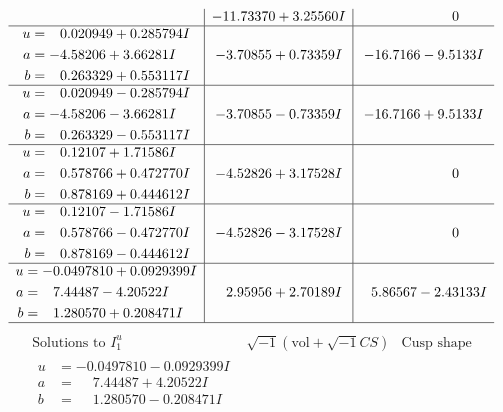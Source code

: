 \documentclass[1p]{elsarticle_modified}
\theoremstyle{definition}
\newcommand{\I}{\sqrt{-1}}
\begin{document}
$$\begin{array}{c|c|c}
 & -11.73370 + 3.25560 I & \phantom{-0.000000 } 0 \\ \hline\begin{aligned}
u &= \phantom{-}0.020949 + 0.285794 I \\
a &= -4.58206 + 3.66281 I \\
b &= \phantom{-}0.263329 + 0.553117 I\end{aligned}
 & -3.70855 + 0.73359 I & -16.7166 - 9.5133 I \\ \hline\begin{aligned}
u &= \phantom{-}0.020949 - 0.285794 I \\
a &= -4.58206 - 3.66281 I \\
b &= \phantom{-}0.263329 - 0.553117 I\end{aligned}
 & -3.70855 - 0.73359 I & -16.7166 + 9.5133 I \\ \hline\begin{aligned}
u &= \phantom{-}0.12107 + 1.71586 I \\
a &= \phantom{-}0.578766 + 0.472770 I \\
b &= \phantom{-}0.878169 + 0.444612 I\end{aligned}
 & -4.52826 + 3.17528 I & \phantom{-0.000000 } 0 \\ \hline\begin{aligned}
u &= \phantom{-}0.12107 - 1.71586 I \\
a &= \phantom{-}0.578766 - 0.472770 I \\
b &= \phantom{-}0.878169 - 0.444612 I\end{aligned}
 & -4.52826 - 3.17528 I & \phantom{-0.000000 } 0 \\ \hline\begin{aligned}
u &= -0.0497810 + 0.0929399 I \\
a &= \phantom{-}7.44487 - 4.20522 I \\
b &= \phantom{-}1.280570 + 0.208471 I\end{aligned}
 & \phantom{-}2.95956 + 2.70189 I & \phantom{-}5.86567 - 2.43133 I\\
 \hline 
 \end{array}$$\newpage$$\begin{array}{c|c|c}  
\text{Solutions to }I^u_{1}& \I (\text{vol} + \sqrt{-1}CS) & \text{Cusp shape}\\
 \hline 
\begin{aligned}
u &= -0.0497810 - 0.0929399 I \\
a &= \phantom{-}7.44487 + 4.20522 I \\
b &= \phantom{-}1.280570 - 0.208471 I\end{aligned}

\end{array}$$
\end{document}
